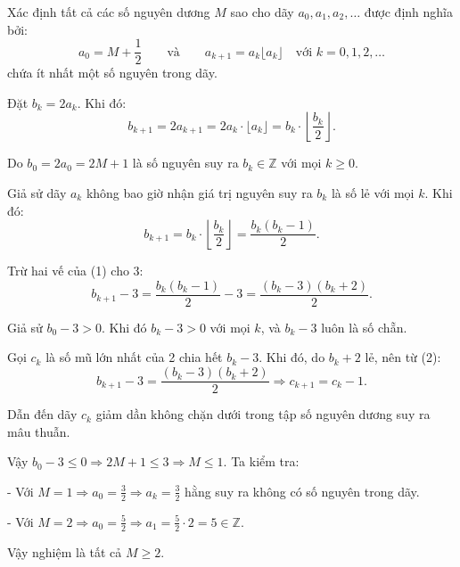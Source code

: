 \ifshowproblemandsoln
\ifshowproblem\begin{problem}\label{problem:IMO-2015-SL-P1}\fi
\ifshowsoln\begin{problem}\fi
    Xác định tất cả các số nguyên dương \( M \) sao cho dãy \( a_0, a_1, a_2, \ldots \) được định nghĩa bởi:
    \[
        a_0 = M + \frac{1}{2} \qquad \text{và} \qquad a_{k+1} = a_k \lfloor a_k \rfloor \quad \text{với } k = 0, 1, 2, \ldots
    \]
    chứa ít nhất một số nguyên trong dãy.    
\end{problem}
\fi

\ifshowsoln
\begin{soln}\footnotemark
    Đặt \( b_k = 2a_k \). Khi đó:
    \[
        b_{k+1} = 2a_{k+1} = 2a_k \cdot \lfloor a_k \rfloor = b_k \cdot \left\lfloor \frac{b_k}{2} \right\rfloor.
    \]

    Do \( b_0 = 2a_0 = 2M + 1 \) là số nguyên suy ra \( b_k \in \mathbb{Z} \) với mọi \( k \ge 0 \).

    Giả sử dãy \( a_k \) không bao giờ nhận giá trị nguyên suy ra \( b_k \) là số lẻ với mọi \( k \). Khi đó:
    \[
        b_{k+1} = b_k \cdot \left\lfloor \frac{b_k}{2} \right\rfloor = \frac{b_k(b_k - 1)}{2}. \tag{1}
    \]

    Trừ hai vế của (1) cho 3:
    \[
        b_{k+1} - 3 = \frac{b_k(b_k - 1)}{2} - 3 = \frac{(b_k - 3)(b_k + 2)}{2}. \tag{2}
    \]

    Giả sử \( b_0 - 3 > 0 \). Khi đó \( b_k - 3 > 0 \) với mọi \( k \), và \( b_k - 3 \) luôn là số chẵn.

    Gọi \( c_k \) là số mũ lớn nhất của 2 chia hết \( b_k - 3 \). Khi đó, do \( b_k + 2 \) lẻ, nên từ (2):
    \[
        b_{k+1} - 3 = \frac{(b_k - 3)(b_k + 2)}{2} \Rightarrow c_{k+1} = c_k - 1.
    \]

    Dẫn đến dãy \( c_k \) giảm dần không chặn dưới trong tập số nguyên dương suy ra mâu thuẫn.

    Vậy \( b_0 - 3 \le 0 \Rightarrow 2M + 1 \le 3 \Rightarrow M \le 1 \). Ta kiểm tra:

    - Với \( M = 1 \Rightarrow a_0 = \frac{3}{2} \Rightarrow a_k = \frac{3}{2} \) hằng suy ra không có số nguyên trong dãy.

    - Với \( M = 2 \Rightarrow a_0 = \frac{5}{2} \Rightarrow a_1 = \frac{5}{2} \cdot 2 = 5 \in \mathbb{Z} \).

    Vậy nghiệm là tất cả \( M \ge 2 \).
\end{soln}


\end{problem}
